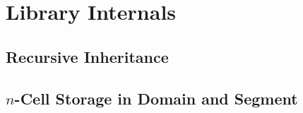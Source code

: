 \chapter{Library Internals} \label{chap:internals}


\section{Recursive Inheritance}

\section{$n$-Cell Storage in Domain and Segment}
